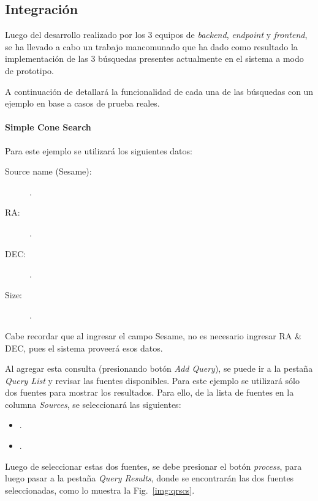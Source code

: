 \subsection{Integración}

Luego del desarrollo realizado por los 3 equipos de \emph{backend},
\emph{endpoint} y \emph{frontend}, se ha llevado a cabo un trabajo
mancomunado que ha dado como resultado la implementación de las 3
búsquedas presentes actualmente en el sistema a modo de prototipo.

A continuación de detallará la funcionalidad de cada una de las
búsquedas con un ejemplo en base a casos de prueba reales.

\paragraph{Simple Cone Search}

Para este ejemplo se utilizará los siguientes datos:

\begin{description}
  \item [Source name (Sesame):] .
  \item [RA:] .
  \item [DEC:] .
  \item [Size:] .
\end{description}

Cabe recordar que al ingresar el campo Sesame, no es necesario
ingresar RA \& DEC, pues el sistema proveerá esos datos.

Al agregar esta consulta (presionando botón \emph{Add Query}), se puede
ir a la pestaña \emph{Query List} y revisar las fuentes disponibles.
Para este ejemplo se utilizará sólo dos fuentes para mostrar los
resultados. Para ello, de la lista de fuentes en la columna
\emph{Sources}, se seleccionará las siguientes:

\begin{itemize}
  \item .
  \item .
\end{itemize}

Luego de seleccionar estas dos fuentes, se debe presionar el botón
\emph{process}, para luego pasar a la pestaña \emph{Query Results},
donde se encontrarán las dos fuentes seleccionadas, como lo muestra la
Fig.~\ref{img:qrscs}.

